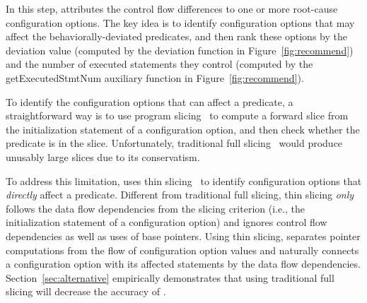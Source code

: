 



In this step, \ourtool attributes the control flow differences
to one or more root-cause configuration options.
The key idea is to identify configuration options that
may affect the behaviorally-deviated predicates, and then rank
these options by
the deviation value (computed by the
{deviation} function in Figure~\ref{fig:recommend})
and the number of executed statements they control (computed
by the {get\-ExecutedStmtNum} auxiliary function in Figure~\ref{fig:recommend}).


To identify the configuration options that can affect
a predicate, a straightforward way is to use program slicing~\cite{Weiser:1981}
to compute a forward slice from the initialization statement
of a configuration option, and then check whether the predicate is
in the slice. Unfortunately, traditional
full slicing~\cite{Weiser:1981} would produce
unusably large slices due
to its conservatism. 


To address this limitation, \ourtool uses thin slicing~\cite{Sridharan:2007}
to identify configuration options that \textit{directly} affect
a predicate. Different from traditional full slicing,
thin slicing \textit{only} follows the data flow dependencies
from the slicing criterion (i.e., the initialization statement of a
configuration option) and ignores control flow dependencies
as well as uses of base pointers. Using thin slicing, \ourtool separates
pointer computations from the flow of configuration option
values and naturally connects a configuration option with its
affected statements by the data flow dependencies. Section~\ref{sec:alternative}
empirically demonstrates that using traditional full slicing
will decrease the accuracy of \ourtool.


